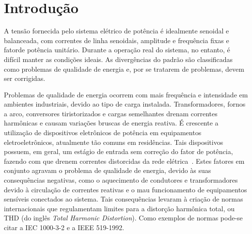 
\chapter{Introdução}\label{introducao}


	A tensão fornecida pelo sistema elétrico de potência é idealmente senoidal e balanceada, com correntes de linha senoidais, amplitude e frequência fixas e fatorde potência unitário. Durante a operação real do sistema, no entanto, é difícil manter as condições ideais. As divergências do padrão são classificadas como problemas de qualidade de energia e, por se tratarem de problemas, devem ser corrigidas.

	Problemas de qualidade de energia ocorrem com mais frequência e intensidade em ambientes industriais, devido ao tipo de carga instalada. Transformadores, fornos a arco, conversores tiristorizados e cargas semelhantes drenam correntes harmônicas e causam variações bruscas de energia reativa. É crescente a utilização de dispositivos eletrônicos de potência em equipamentos eletroeletrônicos, atualmente tão comuns em residências. Tais dispositivos possuem, em geral, um estágio de entrada sem correção do fator de potência, fazendo com que drenem correntes distorcidas da rede elétrica~\cite{ref:MANSOOR}. Estes fatores em conjunto agravam o problema de qualidade de energia, devido às suas consequências negativas, como	o aquecimento de condutores e transformadores devido à circulação de correntes reativas e o mau funcionamento de equipamentos sensíveis conectados ao sistema.	Tais consequências levaram à criação de normas internacionais que regulamentam limites para a distorção harmônica total, ou THD (do inglês \emph{Total Harmonic Distortion}). Como exemplos de normas pode-se citar a IEC 1000-3-2 e a IEEE 519-1992.

